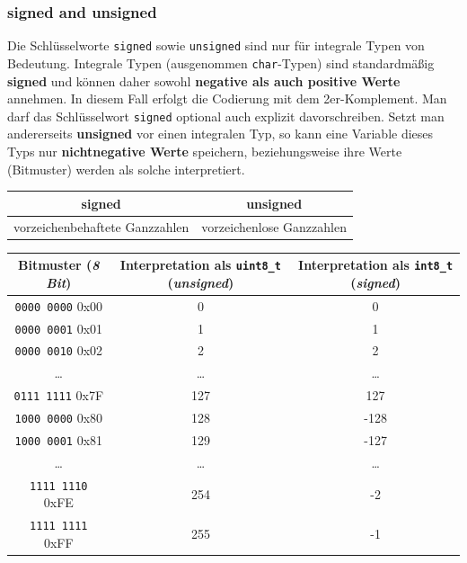 \documentclass[a4paper]{report}
\begin{document}
\subsubsection{signed and unsigned}
Die Schlüsselworte \texttt{signed} sowie \texttt{unsigned} sind nur für integrale Typen von Bedeutung. Integrale Typen (ausgenommen \texttt{char}-Typen) sind standardmäßig \textbf{signed} und können daher sowohl \textbf{negative als auch positive Werte} annehmen. In diesem Fall erfolgt die Codierung mit dem 2er-Komplement. Man darf das Schlüsselwort \texttt{signed} optional auch explizit davorschreiben. Setzt man andererseits \textbf{unsigned} vor einen integralen Typ, so kann eine Variable dieses Typs nur \textbf{nichtnegative Werte} speichern, beziehungsweise ihre Werte (Bitmuster) werden als solche interpretiert.

\begin{center}
\begin{tabular}{|c|c|} \hline
	\textbf{signed} & \textbf{unsigned} \\ \hline
	vorzeichenbehaftete Ganzzahlen & vorzeichenlose Ganzzahlen \\ \hline
\end{tabular}
\end{center}

\begin{center}
	\begin{tabular}{|c|c|c|} \hline
		\textbf{Bitmuster (\textit{8 Bit})} & \textbf{Interpretation als \texttt{uint8\_t} (\textit{unsigned})} & \textbf{Interpretation als \texttt{int8\_t} (\textit{signed})} \\ \hline
		\texttt{0000 0000} \quad 0x00 & 0 & 0 \\
		\texttt{0000 0001} \quad 0x01 & 1 & 1 \\
		\texttt{0000 0010} \quad 0x02 & 2 & 2 \\
		\dots & \dots & \dots \\
		\texttt{0111 1111} \quad 0x7F & 127 & 127 \\
		\texttt{1000 0000} \quad 0x80 & 128 & -128 \\
		\texttt{1000 0001} \quad 0x81 & 129 & -127 \\
		\dots & \dots & \dots \\
		\texttt{1111 1110} \quad 0xFE & 254 & -2 \\
		\texttt{1111 1111} \quad 0xFF & 255 & -1 \\ \hline
	\end{tabular}
\end{center}
 
\end{document}
